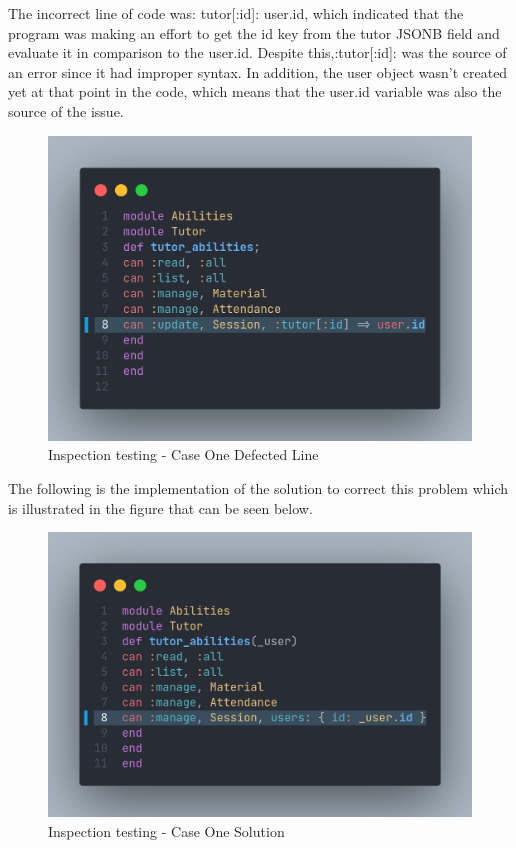 \begin{justify}
    \vspace{0.25cm}
    \newendline The incorrect line of code was: tutor[:id]: user.id, which indicated that the program was making an effort to get the id key from the tutor JSONB field and evaluate it in comparison to the user.id. Despite this,:tutor[:id]: was the source of an error since it had improper syntax. In addition, the user object wasn't created yet at that point in the code, which means that the user.id variable was also the source of the issue.

    \begin{figure}[H]
        \centerline{\includegraphics[width=150mm,scale=1]{figures/implementation_and_testing/testing/MIS/code_before.png}}
        \caption{Inspection testing - Case One Defected Line}
        \label{Inspection_403_defected_line}
    \end{figure}
    
    
    \vspace{0.25cm}
    \newendline The following is the implementation of the solution to correct this problem which is illustrated in the figure that can be seen below.

    \begin{figure}[H]
        \centerline{\includegraphics[width=150mm,scale=1]{figures/implementation_and_testing/testing/MIS/code.png}}
        \caption{Inspection testing - Case One Solution}
        \label{Inspection_403_solution}
    \end{figure}



\end{justify}
